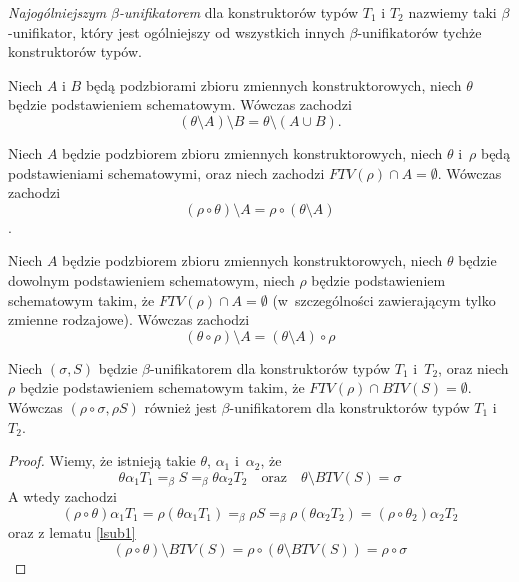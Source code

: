 \documentclass[11pt,leqno]{article}
\begin{document}
\begin{definicja}
\emph{Najogólniejszym $\beta$-unifikatorem} dla konstruktorów typów $T_1$ i $T_2$ nazwiemy taki $\beta$-unifikator,
który jest ogólniejszy od wszystkich innych $\beta$-unifikatorów tychże konstruktorów typów.
\end{definicja}

\begin{lemat}
Niech $A$ i $B$ będą podzbiorami zbioru zmiennych konstruktorowych, niech $\theta$ będzie podstawieniem schematowym.
Wówczas zachodzi
\[
(\theta \setminus A) \setminus B = \theta \setminus (A \cup B).
\]
\label{lsub0}
\end{lemat}

\begin{lemat}
Niech $A$ będzie podzbiorem zbioru zmiennych konstruktorowych, niech $\theta$ i~$\rho$ będą podstawieniami schematowymi, oraz
niech zachodzi $FTV(\rho) \cap A = \emptyset$. Wówczas zachodzi 
\[
(\rho \circ \theta) \setminus A = \rho \circ (\theta \setminus A)
\].
\label{lsub1}
\end{lemat}

\begin{lemat}
Niech $A$ będzie podzbiorem zbioru zmiennych konstruktorowych, niech $\theta$ będzie dowolnym podstawieniem schematowym,
niech $\rho$ będzie podstawieniem schematowym takim, że $FTV(\rho) \cap A = \emptyset$ (w~szczególności zawierającym tylko zmienne rodzajowe). 
Wówczas zachodzi
\[
(\theta \circ \rho) \setminus A = (\theta \setminus A) \circ \rho
\]
\label{lsub2}
\end{lemat}

\begin{lemat}
Niech $(\sigma, S)$ będzie $\beta$-unifikatorem dla konstruktorów typów $T_1$ i~$T_2$, oraz niech $\rho$ będzie 
podstawieniem schematowym takim, że \mbox{$FTV(\rho) \cap BTV(S) = \emptyset$}.
Wówczas $(\rho \circ \sigma, \rho S)$ również jest $\beta$-unifikatorem dla konstruktorów typów $T_1$ i~$T_2$.
\label{lunif1}
\end{lemat}
\begin{proof}
Wiemy, że istnieją takie $\theta$, $\alpha_1$ i~$\alpha_2$, że
\[
\theta \alpha_1 T_1 =_\beta S =_\beta \theta \alpha_2 T_2 \quad \textrm{oraz} \quad \theta \setminus BTV(S) = \sigma
\]
A wtedy zachodzi
\[
(\rho \circ \theta) \alpha_1 T_1 = \rho(\theta \alpha_1 T_1) =_\beta \rho S =_\beta \rho(\theta \alpha_2 T_2) = (\rho \circ \theta_2) \alpha_2 T_2
\]
oraz z lematu \ref{lsub1}
\[
(\rho \circ \theta) \setminus BTV(S) = \rho \circ (\theta \setminus BTV(S)) = \rho \circ \sigma
\]
\end{proof}
\end{document}
